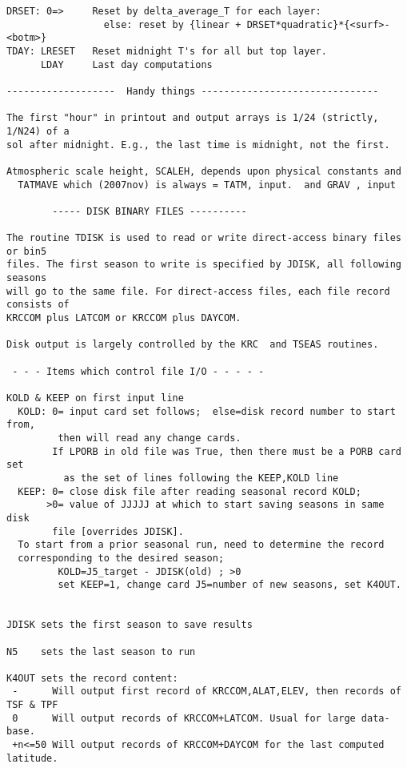 \begin{verbatim}
DRSET: 0=>     Reset by delta_average_T for each layer:
                 else: reset by {linear + DRSET*quadratic}*{<surf>-<botm>}
TDAY: LRESET   Reset midnight T's for all but top layer.
      LDAY     Last day computations

-------------------  Handy things -------------------------------

The first "hour" in printout and output arrays is 1/24 (strictly, 1/N24) of a
sol after midnight. E.g., the last time is midnight, not the first.

Atmospheric scale height, SCALEH, depends upon physical constants and 
  TATMAVE which (2007nov) is always = TATM, input.  and GRAV , input

        ----- DISK BINARY FILES ----------

The routine TDISK is used to read or write direct-access binary files or bin5
files. The first season to write is specified by JDISK, all following seasons
will go to the same file. For direct-access files, each file record consists of
KRCCOM plus LATCOM or KRCCOM plus DAYCOM.

Disk output is largely controlled by the KRC  and TSEAS routines.

 - - - Items which control file I/O - - - - -

KOLD & KEEP on first input line
  KOLD: 0= input card set follows;  else=disk record number to start from,
         then will read any change cards.
        If LPORB in old file was True, then there must be a PORB card set 
          as the set of lines following the KEEP,KOLD line
  KEEP: 0= close disk file after reading seasonal record KOLD;
       >0= value of JJJJJ at which to start saving seasons in same disk 
        file [overrides JDISK].
  To start from a prior seasonal run, need to determine the record 
  corresponding to the desired season;
         KOLD=J5_target - JDISK(old) ; >0
         set KEEP=1, change card J5=number of new seasons, set K4OUT.


JDISK sets the first season to save results

N5    sets the last season to run

K4OUT sets the record content:
 -      Will output first record of KRCCOM,ALAT,ELEV, then records of TSF & TPF
 0      Will output records of KRCCOM+LATCOM. Usual for large data-base.
 +n<=50 Will output records of KRCCOM+DAYCOM for the last computed latitude.


\end{verbatim}
